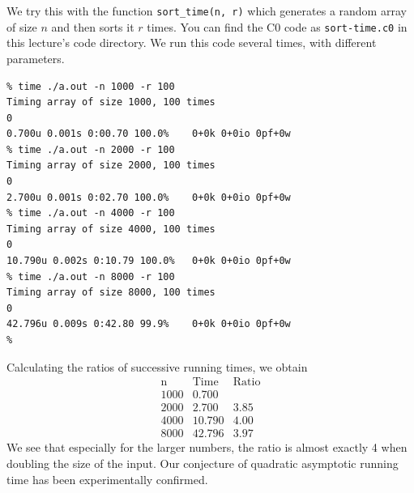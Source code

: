 We try this with the function \lstinline'sort_time(n, r)' which generates a
random array of size $n$ and then sorts it $r$ times.  You can find
the C0 code as \lstinline'sort-time.c0' in this lecture's code directory.
We run this code several times, with different parameters.


\begin{lstlisting}[language={[coin]C}]
% cc0 selectsort.c0 sort-time.c0
% time ./a.out -n 1000 -r 100
Timing array of size 1000, 100 times
0
0.700u 0.001s 0:00.70 100.0%	0+0k 0+0io 0pf+0w
% time ./a.out -n 2000 -r 100
Timing array of size 2000, 100 times
0
2.700u 0.001s 0:02.70 100.0%	0+0k 0+0io 0pf+0w
% time ./a.out -n 4000 -r 100
Timing array of size 4000, 100 times
0
10.790u 0.002s 0:10.79 100.0%	0+0k 0+0io 0pf+0w
% time ./a.out -n 8000 -r 100
Timing array of size 8000, 100 times
0
42.796u 0.009s 0:42.80 99.9%	0+0k 0+0io 0pf+0w
%
\end{lstlisting}

Calculating the ratios of successive running times, we obtain
$$
\begin{array}{rrr}
       \mbox{n} & \mbox{Time}  & \mbox{Ratio}
\\ \hline
   1000 & 0.700  &
\\ 2000 & 2.700  & 3.85
\\ 4000 & 10.790 & 4.00
\\ 8000 & 42.796 & 3.97
\end{array}
$$
We see that especially for the larger numbers, the ratio is almost
exactly 4 when doubling the size of the input.  Our conjecture of
quadratic asymptotic running time has been experimentally confirmed.



